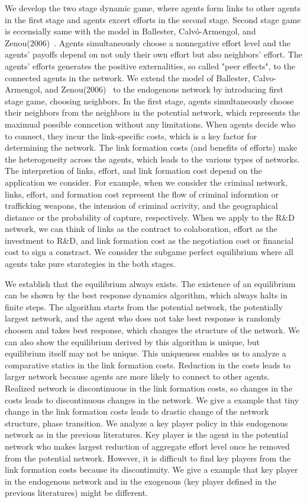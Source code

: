\documentclass[12pt]{article}
\theoremstyle{definition}
\begin{document}
We develop the two stage dynamic game, where agents form links to other agents in the first stage and agents excert efforts in the second stage.
Second stage game is eccensially same with the model in Ballester, Calv\'{o}-Armengol, and Zenou(2006)~\cite{whowho}.
Agents simultaneously choose a nonnegative effort level and the agents' payoffs depend on not only their own effort but also neighbors' effort.
The agents' efforts generates the positive externalities, so called "peer effects", to the connected agents in the network.
We extend the model of Ballester, Calvo-Armengol, and Zenou(2006)~\cite{whowho} to the endogenous network by introducing first stage game, choosing neighbors.
In the first stage, agents simultaneously choose their neighbors from the neighbors in the potential network, which represents the maximual possible conncetion without any limitations.
When agents decide who to connect, they incur the link-specific costs, which is a key factor for determining the network.
The link formation costs (and benefits of efforts) make the heterogeneity across the agents, which leads to the various types of networks.
The interpretion of links, effort, and link formation cost depend on the application we consider.
For example, when we consider the criminal network, links, effort, and formation cost represent the flow of criminal informtion or trafficking weapons, the intension of criminal acrivity, and the geographical distance or the probability of capture, respectively.
When we apply to the R\&D network, we can think of links as the contract to colaboration, effort as the investment to R\&D, and link formation cost as the negotiation cost or financial cost to sign a constract.
We consider the subgame perfect equilibrium where all agents take pure starategies in the both stages.

We establish that the equilibrium always exists.
The existence of an equilibrium can be shown by the best response dynamics algorithm, which always halts in finite steps.
The algorithm starts from the potential network, the potentially largest network, and the agent who does not take best response is randomly choosen and takes best response, which changes the structure of the network.
We can also show the equilibrium derived by this algorithm is unique, but equilibrium itself may not be unique.
This uniqueness enables us to analyze a comparative statics in the link formation costs.
Reduction in the costs leads to larger network because agents are more likely to connect to other agents.
Realized network is discontinuous in the link formation costs, so changes in the costs leads to discontinuous changes in the network.
We give a example that tiny change in the link formation costs leads to drastic change of the network structure, phase transition.
We analyze a key player policy in this endogenous network as in the previous literatures.
Key player is the agent in the potential network who makes largest reduction of aggregate effort level once he removed from the potential network.
However, it is difficult to find key players from the link formation costs because its discontinuity.
We give a example that key player in the endogenous network and in the exogenous (key player defined in the previous literatures) might be different.
\end{document}

